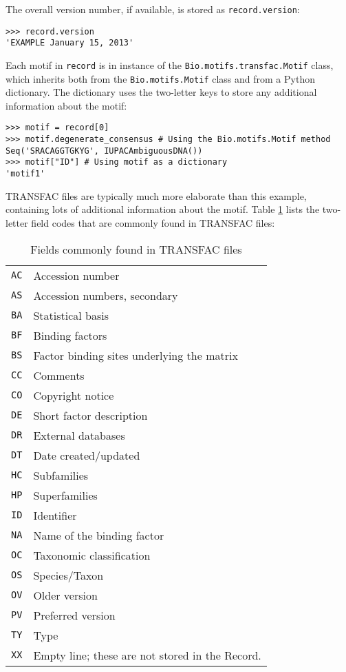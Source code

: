 The overall version number, if available, is stored as \verb+record.version+:
\begin{verbatim}
>>> record.version
'EXAMPLE January 15, 2013'
\end{verbatim}

Each motif in \verb+record+ is in instance of the \verb+Bio.motifs.transfac.Motif+
class, which inherits both from the \verb+Bio.motifs.Motif+ class and
from a Python dictionary. The dictionary uses the two-letter keys to
store any additional information about the motif:
\begin{verbatim}
>>> motif = record[0]
>>> motif.degenerate_consensus # Using the Bio.motifs.Motif method
Seq('SRACAGGTGKYG', IUPACAmbiguousDNA())
>>> motif["ID"] # Using motif as a dictionary
'motif1'
\end{verbatim}

TRANSFAC files are typically much more elaborate than this example, containing
lots of additional information about the motif. Table \ref{table:transfaccodes}
lists the two-letter field codes that are commonly found in TRANSFAC files:
\begin{table}[h]
\label{table:transfaccodes}
\begin{center}
\caption{Fields commonly found in TRANSFAC files}
\begin{tabular}{|l|l||}
\verb+AC+ & Accession number \\
\verb+AS+ & Accession numbers, secondary \\
\verb+BA+ & Statistical basis \\
\verb+BF+ & Binding factors \\
\verb+BS+ & Factor binding sites underlying the matrix \\
\verb+CC+ & Comments \\
\verb+CO+ & Copyright notice \\
\verb+DE+ & Short factor description \\
\verb+DR+ & External databases \\
\verb+DT+ & Date created/updated \\
\verb+HC+ & Subfamilies \\
\verb+HP+ & Superfamilies \\
\verb+ID+ & Identifier \\
\verb+NA+ & Name of the binding factor \\
\verb+OC+ & Taxonomic classification \\
\verb+OS+ & Species/Taxon \\
\verb+OV+ & Older version \\
\verb+PV+ & Preferred version \\
\verb+TY+ & Type \\
\verb+XX+ & Empty line; these are not stored in the Record. \\
\end{tabular}
\end{center}
\end{table}

